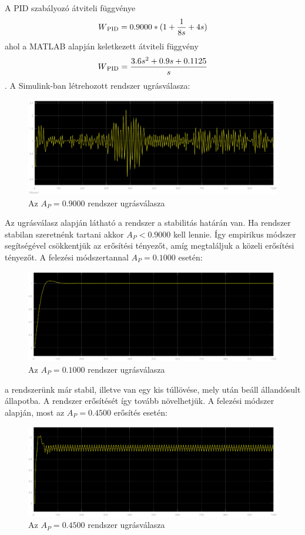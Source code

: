 \documentclass[12pt]{article}
\begin{document}
A PID szabályozó átviteli függvénye \[W\textsubscript{PID}=0.9000*(1+\frac{1}{8s}+4s)\]
ahol a MATLAB alapján keletkezett átviteli függvény \[W\textsubscript{PID}=\frac{3.6s^2+0.9s+0.1125}{s}\].
A Simulink-ban létrehozott rendszer ugrásválasza:
\begin{figure}[H]
\centering
\includegraphics[scale=.50]{zgpidosc}
\caption{Az $A_P=0.9000$ rendszer ugrásválasza}
\end{figure}
Az ugrásválasz alapján látható a rendszer a stabilitás határán van. Ha rendszer stabilan szeretnénk tartani akkor $A_P<0.9000$ kell lennie. Így empirikus módszer segítségével csökkentjük az erősítési tényezőt, amíg megtaláljuk a közeli erősítési tényezőt.
A felezési módszertannal $A_P=0.1000$ esetén:
\begin{figure}[H]
\centering
\includegraphics[scale=.50]{ap0100}
\caption{Az $A_P=0.1000$ rendszer ugrásválasza}
\end{figure}
a rendszerünk már stabil, illetve van egy kis túllövése, mely után beáll állandósult állapotba. A rendszer erősítését így tovább növelhetjük. A felezési módszer alapján, most az $A_P=0.4500$ erősítés esetén:
\begin{figure}[H]
\centering
\includegraphics[scale=.50]{ap0450}
\caption{Az $A_P=0.4500$ rendszer ugrásválasza}
\end{figure}
\end{document}
